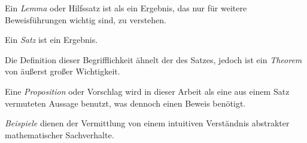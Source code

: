 \theoremstyle{Lemma}
\begin{Lemma}{}
Ein \emph{Lemma} oder Hilfssatz ist als ein Ergebnis, das nur für weitere Beweisführungen wichtig sind, zu verstehen.
\end{Lemma}

\theoremstyle{Satz}
\begin{Satz}{}
Ein \emph{Satz} ist ein Ergebnis. 
\end{Satz}

\theoremstyle{theo}
\begin{theo}
Die Definition dieser Begrifflichkeit ähnelt der des Satzes, jedoch ist ein \emph{Theorem} von äußerst großer Wichtigkeit.
\end{theo}

\theoremstyle{prop}
\begin{prop}{}
Eine \emph{Proposition} oder Vorschlag wird in dieser Arbeit als eine aus einem Satz vermuteten Aussage benutzt, was dennoch einen Beweis benötigt.
\end{prop}

\theoremstyle{example}
\begin{example}
\emph{Beispiele} dienen der Vermittlung von einem intuitiven Verständnis abstrakter mathematischer Sachverhalte.
\end{example}








